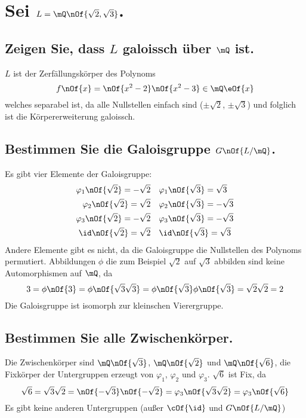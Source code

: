 \section{Sei $L = \mQ\nOf{\sqrt{2},\sqrt{3}}$.}
\subsection{Zeigen Sie, dass $L$ galoissch über $\mQ$ ist.}
$L$ ist der Zerfällungskörper des Polynoms
\begin{equation}
	f\nOf{x} = \nOf{x^2-2}\nOf{x^2-3} \in \mQ\eOf{x}
\end{equation}
welches separabel ist, da alle Nullstellen einfach sind ($\pm\sqrt{2}$, $\pm\sqrt{3}$) und folglich ist die Körpererweiterung galoissch.


\subsection{Bestimmen Sie die Galoisgruppe $G\nOf{L/\mQ}$.}
Es gibt vier Elemente der Galoisgruppe:
\begin{align}
	\varphi_1\nOf{\sqrt2} = -\sqrt2 & \quad \varphi_1\nOf{\sqrt3} = \sqrt3 \\
	\varphi_2\nOf{\sqrt2} = \sqrt2 & \quad \varphi_2\nOf{\sqrt3} = -\sqrt3 \\
	\varphi_3\nOf{\sqrt2} = -\sqrt2 & \quad \varphi_3\nOf{\sqrt3} = -\sqrt3 \\
	\id\nOf{\sqrt2} = \sqrt2 & \quad \id\nOf{\sqrt3} = \sqrt3 
\end{align}
Andere Elemente gibt es nicht, da die Galoisgruppe die Nullstellen des Polynoms permutiert. Abbildungen $\phi$ die zum Beispiel $\sqrt2$ auf $\sqrt3$ abbilden sind keine Automorphismen auf $\mQ$, da
\begin{equation}
	3 = \phi\nOf{3} = \phi\nOf{\sqrt3\sqrt3} = \phi\nOf{\sqrt3}\phi\nOf{\sqrt3} = \sqrt2\sqrt2 = 2
\end{equation}
Die Galoisgruppe ist isomorph zur kleinschen Vierergruppe.


\subsection{Bestimmen Sie alle Zwischenkörper.}
Die Zwischenkörper sind $\mQ\nOf{\sqrt{3}}$, $\mQ\nOf{\sqrt{2}}$ und $\mQ\nOf{\sqrt{6}}$, die Fixkörper der Untergruppen erzeugt von $\varphi_1$, $\varphi_2$ und $\varphi_3$. $\sqrt6$ ist Fix, da
\begin{equation}
	\sqrt6 = \sqrt3\sqrt2 = \nOf{-\sqrt3}\nOf{-\sqrt2} = \varphi_3\nOf{\sqrt3\sqrt2} = \varphi_3\nOf{\sqrt6}
\end{equation}
Es gibt keine anderen Untergruppen (außer $\cOf{\id}$ und $G\nOf{L/\mQ}$)